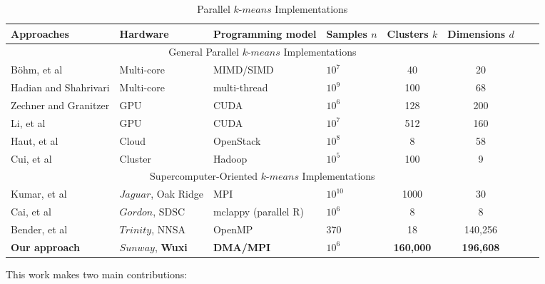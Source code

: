 \documentclass[10pt,journal,compsoc]{IEEEtran}
\begin{document}
\begin{table}

  \caption{Parallel $k$-$means$ Implementations}
  \label{background}
  \begin{tabular}{p{4cm} p{3cm} p{3cm}p{2cm} c c c c}
   \hline
    Approaches&Hardware &Programming model &Samples $n$&Clusters $k$ & Dimensions $d$ \\
   \hline
 
    \multicolumn{6}{c}{General Parallel $k$-$means$ Implementations}\\
    \hline
    B{\"o}hm, et al\cite{bohm2017multi} & Multi-core &MIMD/SIMD &$10^7$& 40& 20 \\
  
    \hline
     Hadian and Shahrivari \cite{hadian2014high}&Multi-core &multi-thread &$10^9$ &100&68 \\
     \hline
    Zechner and Granitzer \cite{zechner2009accelerating}&GPU&CUDA& $10^6$&128&200\\
    \hline
    Li, et al \cite{li2010speeding}&GPU&CUDA& $10^7$&512&160\\
      \hline
    Haut, et al \cite{haut2017cloud}& Cloud &OpenStack&$10^8$ &8 &58 \\
    \hline  
    Cui, et al \cite{cui2014optimized} &Cluster& Hadoop&$10^5$&100&9\\
    \hline
 
     \hline
    \multicolumn{6}{c}{Supercomputer-Oriented $k$-$means$ Implementations}\\
    \hline
    Kumar, et al \cite{kumar2011parallel}&$Jaguar$, Oak Ridge&MPI&$10^{10}$ &1000 &30\\
    \hline
    Cai, et al \cite{cai2015grouping}&$Gordon$, SDSC&mclappy (parallel R) &$10^6$&8&8\\
    \hline
    Bender, et al \cite{bender2015k}&$Trinity$, NNSA&OpenMP &370 &18&140,256\\
    \hline
    \textbf{Our approach} &\textbf{$Sunway$}, \textbf{Wuxi}&\textbf{DMA/MPI} &\textbf{$10^6$} &\textbf{160,000} &\textbf{196,608}\\
     \hline
  \end{tabular}
  
\end{table}


This work makes two main contributions:
\end{document}
